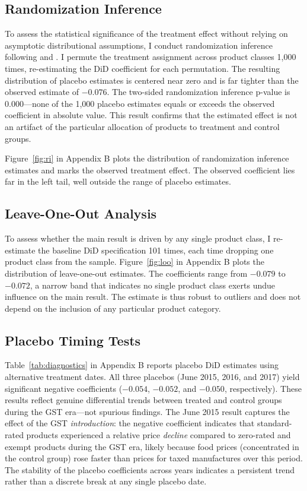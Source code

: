 \documentclass[12pt]{article}
\begin{document}


\subsection{Randomization Inference}

To assess the statistical significance of the treatment effect without relying on asymptotic distributional assumptions, I conduct randomization inference following \citet{fisher1935} and \citet{young2019}. I permute the treatment assignment across product classes 1,000 times, re-estimating the DiD coefficient for each permutation. The resulting distribution of placebo estimates is centered near zero and is far tighter than the observed estimate of $-0.076$. The two-sided randomization inference p-value is 0.000---none of the 1,000 placebo estimates equals or exceeds the observed coefficient in absolute value. This result confirms that the estimated effect is not an artifact of the particular allocation of products to treatment and control groups.

Figure~\ref{fig:ri} in Appendix B plots the distribution of randomization inference estimates and marks the observed treatment effect. The observed coefficient lies far in the left tail, well outside the range of placebo estimates.

\subsection{Leave-One-Out Analysis}

To assess whether the main result is driven by any single product class, I re-estimate the baseline DiD specification 101 times, each time dropping one product class from the sample. Figure~\ref{fig:loo} in Appendix B plots the distribution of leave-one-out estimates. The coefficients range from $-0.079$ to $-0.072$, a narrow band that indicates no single product class exerts undue influence on the main result. The estimate is thus robust to outliers and does not depend on the inclusion of any particular product category.

\subsection{Placebo Timing Tests}

Table~\ref{tab:diagnostics} in Appendix B reports placebo DiD estimates using alternative treatment dates. All three placebos (June 2015, 2016, and 2017) yield significant negative coefficients ($-0.054$, $-0.052$, and $-0.050$, respectively). These results reflect genuine differential trends between treated and control groups during the GST era---not spurious findings. The June 2015 result captures the effect of the GST \emph{introduction}: the negative coefficient indicates that standard-rated products experienced a relative price \emph{decline} compared to zero-rated and exempt products during the GST era, likely because food prices (concentrated in the control group) rose faster than prices for taxed manufactures over this period. The stability of the placebo coefficients across years indicates a persistent trend rather than a discrete break at any single placebo date.
\end{document}
